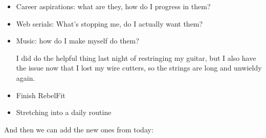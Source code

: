 \documentclass[12pt]{article}
\renewcommand{\,}{\textsuperscript{,}}
\begin{document}
\begin{itemize}
The couch is super nice! It's a sectional that comes into three pieces\footnote{which makes transport miles away easier!}: the two seats (both recliners!) and a center console which is two cupholders and what I assume is meant as a trash or ice box.  
It's a lil curved which is fun, and it holds the projector at a decent height, especially if I have a book to stabilize it underneath. I still do want to hang the projector somehow, but need to figure that out before I can.

\item Career aspirations: what are they, how do I progress in them?

\item Web serials: What's stopping me, do I actually want them?

\item Music: how do I make myself do them?

I did do the helpful thing last night of restringing my guitar, but I also have the issue now that I lost my wire cutters, so the strings are long and unwieldy again.

\item Finish RebelFit

\item Stretching into a daily routine

\end{itemize}

And then we can add the new ones from today:
\end{document}

